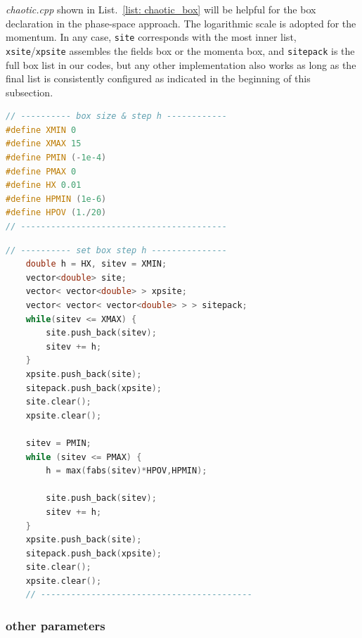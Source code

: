 \documentclass[aps, prd
, preprint
, nofootinbib 
, notitlepage
, superscriptaddress
, longbibliography
]{revtex4-1}
\begin{document}
\textit{chaotic.cpp} shown in List.~\ref{list: chaotic_box} will be helpful for the box declaration in the phase-space approach. The logarithmic scale is adopted for the momentum.
In any case, \texttt{site} corresponds with the most inner list, \texttt{xsite}/\texttt{xpsite} assembles the fields box or the momenta box, and \texttt{sitepack} is the full box list in our codes, but any other implementation also works as long as the final list is consistently configured as indicated in the beginning of this subsection.

\begin{lstlisting}[language = C++, caption={\textit{sample/chaotic.cpp}}, label=list: chaotic_box, firstnumber = 6]
// ---------- box size & step h ------------
#define XMIN 0
#define XMAX 15
#define PMIN (-1e-4)
#define PMAX 0
#define HX 0.01
#define HPMIN (1e-6)
#define HPOV (1./20)
// -----------------------------------------
\end{lstlisting}
\begin{lstlisting}[language = C++, firstnumber = 57]
    // ---------- set box step h ---------------
    double h = HX, sitev = XMIN;
    vector<double> site;
    vector< vector<double> > xpsite;
    vector< vector< vector<double> > > sitepack;
    while(sitev <= XMAX) {
        site.push_back(sitev);
        sitev += h;
    }
    xpsite.push_back(site);
    sitepack.push_back(xpsite);
    site.clear();
    xpsite.clear();

    sitev = PMIN;
    while (sitev <= PMAX) {
        h = max(fabs(sitev)*HPOV,HPMIN);

        site.push_back(sitev);
        sitev += h;
    }
    xpsite.push_back(site);
    sitepack.push_back(xpsite);
    site.clear();
    xpsite.clear();
    // ------------------------------------------
\end{lstlisting}


\subsubsection{other parameters}
\end{document}
